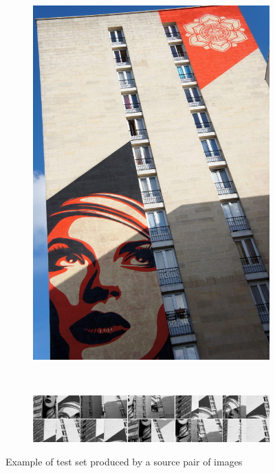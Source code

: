 \documentclass[12pt,journal,compsoc]{IEEEtran}
\begin{document}
\begin{figure}
{\begin{subfigure}[t]{0.044\textwidth}
			\label{fig:fairey1}
		\end{subfigure}%
		~ %
		\begin{subfigure}[t]{0.044\textwidth}
			\centering
			\includegraphics[width=\textwidth]{images/pair_example2}
			\label{fig:fairey2}
		\end{subfigure}%
		~ %
		\begin{subfigure}[t]{0.37\textwidth}
			\centering
			\includegraphics[width=\textwidth]{images/crop_examples}
		\end{subfigure}%
	}%
	\caption{Example of test set produced by a source pair of images}
	\label{fig:fairey}
\end{figure}
\end{document}

